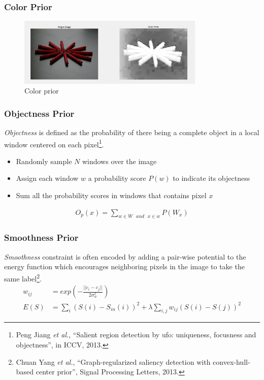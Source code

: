 \documentclass[notheorems,serif,table,compress]{beamer}  %
\begin{document}
\begin{frame}
\frametitle{Color Prior}
\begin{figure}
  \centering
\includegraphics[width=3.5in]{color_prior.png}
  \caption{Color prior}
 \label{center prior}
  \end{figure}
\end{frame}


\begin{frame}
\frametitle{ Objectness Prior}
{\color{blue}\emph{Objectness}} is defined as the probability of there being a complete object in a local window centered on each pixel\footnote{Peng Jiang \textit{et al.}, ``Salient region detection by ufo: uniqueness, focusness and objectness'', in ICCV, 2013.}.
\begin{itemize}
\item Randomly sample $N$ windows over the image 
\item Assign each window $w$ a probability score $P(w)$ to indicate its objectness
\item Sum all the probability scores in windows that contains pixel $x$
\end{itemize}
\begin{align}
O_p(x) = \sum_{w \in W \text{ }and \text{ } x \in w} P(W_x)
\end{align}
\end{frame}


\begin{frame}
\frametitle{ Smoothness Prior}
{\color{blue}\emph{Smoothness}} constraint is often encoded by adding a pair-wise potential to the energy function which encourages neighboring pixels in the image to take the same label\footnote{Chuan Yang \textit{et al.}, ``Graph-regularized saliency detection with convex-hull-based center prior'', Signal Processing Letters, 2013.}.
\begin{align}
w_{ij} & = exp\left(-\frac{||c_i-c_j||}{2\sigma_w^2}\right)\\
E(S) & = \sum_{i}(S(i)-S_{in}(i))^2+\lambda \sum_{i, j}w_{ij}(S(i)-S(j))^2
\end{align}
\end{frame}
\end{document}
